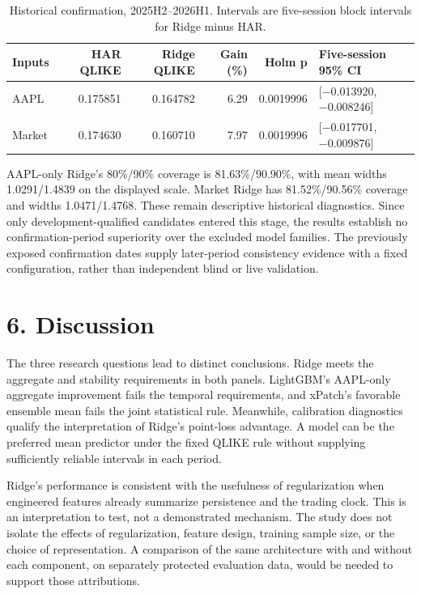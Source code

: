 \begin{table}[!t]
\centering
\footnotesize
\caption{Historical confirmation, 2025H2--2026H1. Intervals are five-session block intervals for Ridge minus HAR.}
\label{tab:results-7}
\begin{tabular}{lrrrrl}
\toprule
Inputs & HAR QLIKE & Ridge QLIKE & Gain (\%) & Holm p & Five-session 95\% CI \\
\midrule
AAPL & 0.175851 & 0.164782 & 6.29 & 0.0019996 & {[}−0.013920, −0.008246{]} \\
Market & 0.174630 & 0.160710 & 7.97 & 0.0019996 & {[}−0.017701, −0.009876{]} \\
\bottomrule
\end{tabular}
\end{table}

AAPL-only Ridge's 80\%/90\% coverage is 81.63\%/90.90\%, with mean
widths 1.0291/1.4839 on the displayed scale. Market Ridge has
81.52\%/90.56\% coverage and widths 1.0471/1.4768. These remain
descriptive historical diagnostics. Since only development-qualified
candidates entered this stage, the results establish no
confirmation-period superiority over the excluded model families. The
previously exposed confirmation dates supply later-period consistency
evidence with a fixed configuration, rather than independent blind or
live validation.

\section{6. Discussion}\label{discussion}

The three research questions lead to distinct conclusions. Ridge meets
the aggregate and stability requirements in both panels. LightGBM's
AAPL-only aggregate improvement fails the temporal requirements, and
xPatch's favorable ensemble mean fails the joint statistical rule.
Meanwhile, calibration diagnostics qualify the interpretation of Ridge's
point-loss advantage. A model can be the preferred mean predictor under
the fixed QLIKE rule without supplying sufficiently reliable intervals
in each period.

Ridge's performance is consistent with the usefulness of regularization
when engineered features already summarize persistence and the trading
clock. This is an interpretation to test, not a demonstrated mechanism.
The study does not isolate the effects of regularization, feature
design, training sample size, or the choice of representation. A
comparison of the same architecture with and without each component, on
separately protected evaluation data, would be needed to support those
attributions.

